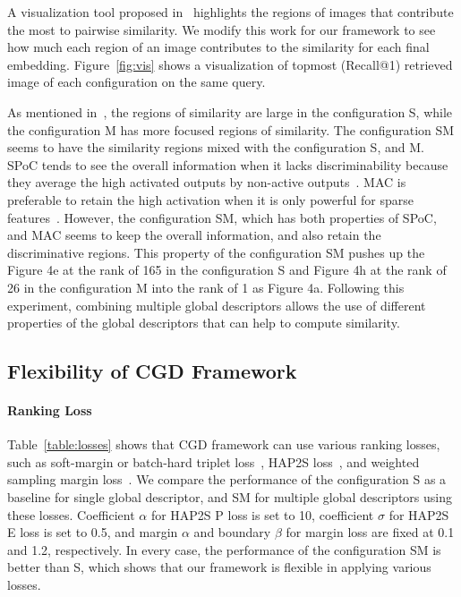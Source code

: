 \documentclass[10pt,twocolumn,letterpaper]{article}
\begin{document}
\begin{CJK}{UTF8}{mj}
A visualization tool proposed in~\cite{stylianouSimVis2019} highlights the regions of images that contribute the most to pairwise similarity.
We modify this work for our framework to see how much each region of an image contributes to the similarity for each final embedding.
Figure~\ref{fig:vis} shows a visualization of topmost (Recall@1) retrieved image of each configuration on the same query.

As mentioned in~\cite{stylianouSimVis2019}, the regions of similarity are large in the configuration S, while the configuration M has more focused regions of similarity.
The configuration SM seems to have the similarity regions mixed with the configuration S, and M.
SPoC tends to see the overall information when it lacks discriminability because they average the high activated outputs by non-active outputs~\cite{hoang2017selective}.
MAC is preferable to retain the high activation when it is only powerful for sparse features~\cite{boureau2010theoretical}.
However, the configuration SM, which has both properties of SPoC, and MAC seems to keep the overall information, and also retain the discriminative regions.
This property of the configuration SM pushes up the Figure {\color{red}4e} at the rank of 165 in the configuration S and Figure {\color{red}4h} at the rank of 26 in the configuration M into the rank of 1 as Figure {\color{red}4a}.
Following this experiment, combining multiple global descriptors allows the use of different properties of the global descriptors that can help to compute similarity.

\subsection{Flexibility of CGD Framework}


\paragraph{Ranking Loss}
Table~\ref{table:losses} shows that CGD framework can use various ranking losses, such as soft-margin or batch-hard triplet loss~\cite{HermansBeyer2017Arxiv}, HAP2S loss~\cite{yu2018hard}, and weighted sampling margin loss~\cite{wu2017sampling}.
We compare the performance of the configuration S as a baseline for single global descriptor, and SM for multiple global descriptors using these losses.
Coefficient $\alpha$ for HAP2S P loss is set to 10, coefficient $\sigma$ for HAP2S E loss is set to 0.5, and margin $\alpha$ and boundary $\beta$ for margin loss are fixed at 0.1 and 1.2, respectively.
In every case, the performance of the configuration SM is better than S, which shows that our framework is flexible in applying various losses.


\end{CJK}
\end{document}
